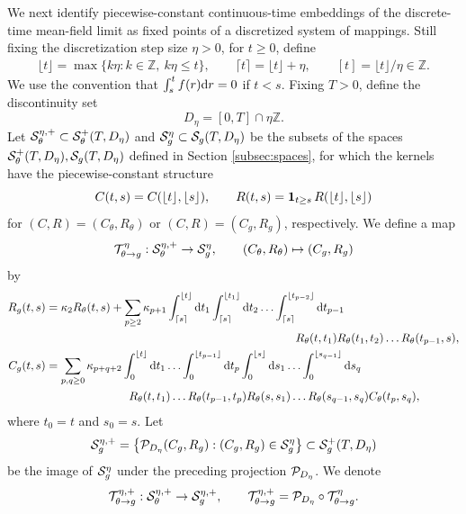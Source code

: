  
We next identify piecewise-constant continuous-time embeddings of the
discrete-time mean-field limit as fixed points of a discretized system of
mappings. Still fixing the discretization step size $\eta>0$,
for $t\geq 0$, define
\begin{align*}
  \lfloor t\rfloor
  = \max\{k\eta: k\in \mathbb Z,\ k\eta\leq t\},
\qquad \lceil t\rceil
  = \lfloor t\rfloor+\eta,
\qquad
  [t]
  = \lfloor t\rfloor/\eta \in \mathbb{Z}.
\end{align*}
We use the convention that $\int_s^t f(r)\mathrm{d} r=0$ if $t<s$.
Fixing $T>0$, define the discontinuity set
\[D_\eta=[0,T] \cap \eta\mathbb{Z}.\]
Let $\mathcal{S}_\theta^{\eta,+} \subset \mathcal{S}_\theta^+(T,D_\eta)$ and $\mathcal{S}_g^\eta \subset
\mathcal{S}_g(T,D_\eta)$ be the subsets of the spaces
$\mathcal{S}_\theta^+(T,D_\eta),\mathcal{S}_g(T,D_\eta)$ defined in Section \ref{subsec:spaces},
for which the kernels have the piecewise-constant structure
\begin{equation}\label{eq:piecewiseconstant}
C(t,s)=C(\lfloor t \rfloor,\lfloor s \rfloor),
\qquad R(t,s)=\mathbf{1}_{t \geq s}\,R(\lfloor t \rfloor,\lfloor s \rfloor)
\end{equation}
for $(C,R)=(C_\theta,R_\theta)$ or $(C,R)=(C_g,R_g)$, respectively. We define a map
\begin{align}\label{eq:Tthetageta}
\mathcal{T}_{\theta \to g}^\eta:\mathcal{S}_\theta^{\eta,+} \to \mathcal{S}_g^\eta,
\qquad (C_\theta,R_\theta) \mapsto (C_g,R_g)
\end{align}
by
\begin{align*}
R_g(t,s)&=\kappa_2R_\theta(t,s)
+\sum_{p \geq 2}\kappa_{p+1}\int_{\lceil s \rceil}^{\lfloor t \rfloor} \d t_1
\int_{\lceil s \rceil}^{\lfloor t_1 \rfloor} \d t_2
\ldots \int_{\lceil s \rceil}^{\lfloor t_{p-2} \rfloor} \d t_{p-1}\\
&\hspace{3in}R_\theta(t,t_1)R_\theta(t_1,t_2)\ldots R_\theta(t_{p-1},s),\\
C_g(t,s)&=\sum_{p,q \geq 0} \kappa_{p+q+2}\int_0^{\lfloor t \rfloor} \d t_1
\ldots \int_0^{\lfloor t_{p-1} \rfloor} \d t_p
\int_0^{\lfloor s \rfloor} \d s_1
\ldots \int_0^{\lfloor s_{q-1} \rfloor} \d s_q\\
&\hspace{1in}R_\theta(t,t_1)\ldots R_\theta(t_{p-1},t_p)
R_\theta(s,s_1)\ldots R_\theta(s_{q-1},s_q) C_\theta(t_p,s_q),
\end{align*}
where $t_0=t$ and $s_0=s$. Let
\[\mathcal{S}_g^{\eta,+}=\big\{\mathcal{P}_{D_\eta}(C_g,R_g):(C_g,R_g) \in
\mathcal{S}_g^\eta\big\} \subset \mathcal{S}_g^+(T,D_\eta)\]
be the image of $\mathcal{S}_g^\eta$ under the preceding projection $\mathcal{P}_{D_\eta}$.
We denote
\[\mathcal{T}_{\theta \to g}^{\eta,+}:\mathcal{S}_\theta^{\eta,+} \to \mathcal{S}_g^{\eta,+},
\qquad \mathcal{T}_{\theta \to g}^{\eta,+}=\mathcal{P}_{D_\eta} \circ \mathcal{T}_{\theta \to g}^\eta.\]

